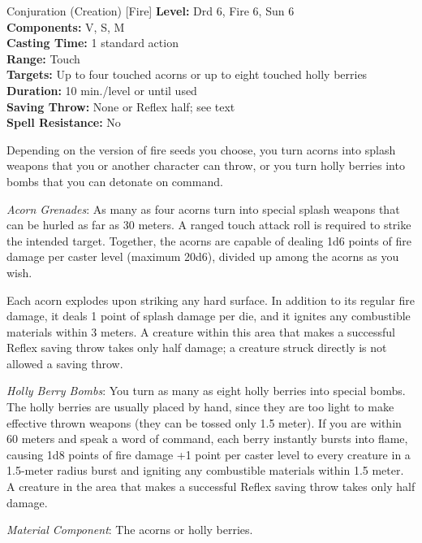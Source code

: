 {Conjuration (Creation) [Fire]}
{
	\textbf{Level:}
	Drd 6, Fire 6, Sun 6\\
	\textbf{Components:}
	V, S, M\\
	\textbf{Casting Time:}
	1 standard action\\
	\textbf{Range:}
	Touch\\
	\textbf{Targets:}
	Up to four touched acorns or up to eight touched holly berries\\
	\textbf{Duration:}
	10 min./level or until used\\
	\textbf{Saving Throw:}
	None or Reflex half; see text\\
	\textbf{Spell Resistance:}
	No\\
}
{
	Depending on the version of fire seeds you choose, you turn acorns into splash weapons that you or another character can throw, or you turn holly berries into bombs that you can detonate on command.

	\textit{Acorn Grenades}:
	As many as four acorns turn into special splash weapons that can be hurled as far as 30 meters. A ranged touch attack roll is required to strike the intended target. Together, the acorns are capable of dealing 1d6 points of fire damage per caster level (maximum 20d6), divided up among the acorns as you wish.

	Each acorn explodes upon striking any hard surface. In addition to its regular fire damage, it deals 1 point of splash damage per die, and it ignites any combustible materials within 3 meters. A creature within this area that makes a successful Reflex saving throw takes only half damage; a creature struck directly is not allowed a saving throw.

	\textit{Holly Berry Bombs}:
	You turn as many as eight holly berries into special bombs. The holly berries are usually placed by hand, since they are too light to make effective thrown weapons (they can be tossed only 1.5 meter). If you are within 60 meters and speak a word of command, each berry instantly bursts into flame, causing 1d8 points of fire damage +1 point per caster level to every creature in a 1.5-meter radius burst and igniting any combustible materials within 1.5 meter. A creature in the area that makes a successful Reflex saving throw takes only half damage.

	\textit{Material Component}:
	The acorns or holly berries.

}
